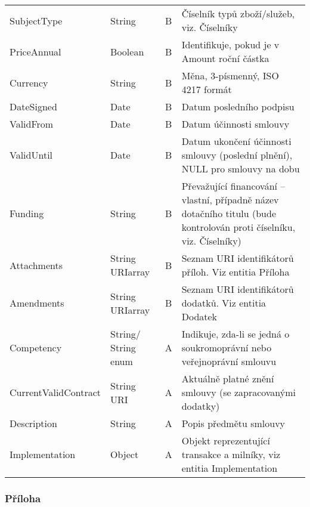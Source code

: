 \begin{center}
\begin{longtable}{lp{20mm}cp{65mm}}
\rowcolor{validateB}SubjectType & String & B & Číselník typů zboží/služeb, viz. Číselníky \\
\rowcolor{validateB}PriceAnnual & Boolean & B & Identifikuje, pokud je v Amount roční částka \\
\rowcolor{validateB}Currency & String & B & Měna, 3-písmenný, ISO 4217 formát \\
\rowcolor{validateB}DateSigned & Date & B & Datum posledního podpisu \\
\rowcolor{validateB}ValidFrom & Date & B & Datum účinnosti smlouvy \\
\rowcolor{validateB}ValidUntil & Date & B & Datum ukončení účinnosti smlouvy (poslední plnění), NULL pro smlouvy na dobu \\
\rowcolor{validateB}Funding & String & B & Převažující financování – vlastní, případně název dotačního titulu (bude kontrolován proti číselníku, viz. Číselníky) \\
\rowcolor{validateB}Attachments & String URIarray & B & Seznam URI identifikátorů příloh. Viz entitia Příloha \\
\rowcolor{validateB}Amendments & String URIarray & B & Seznam URI identifikátorů dodatků. Viz entitia Dodatek \\
\rowcolor{validateA}Competency & String/ String enum & A & Indikuje, zda-li se jedná o soukromoprávní nebo veřejnoprávní smlouvu \\
\rowcolor{validateA}CurrentValidContract & String URI & A & Aktuálně platné znění smlouvy (se zapracovanými dodatky) \\
\rowcolor{validateA}Description & String & A & Popis předmětu smlouvy \\
\rowcolor{validateA}Implementation & Object & A & Objekt reprezentující transakce a milníky, viz entitia Implementation \\
\end{longtable}
\end{center}

\subsubsection*{Příloha}

